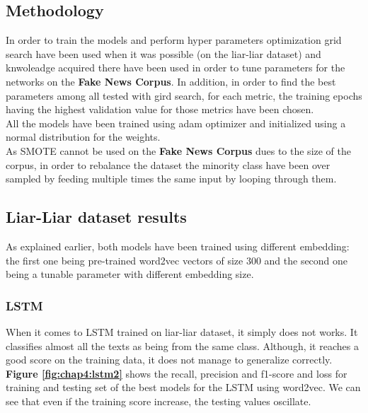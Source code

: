 \subsection{Methodology}
In order to train the models and perform hyper parameters optimization grid search have been used when it was possible (on the liar-liar dataset) and knwoleadge acquired there have been used in order to tune parameters for the networks on the \textbf{Fake News Corpus}. In addition, in order to find the best parameters among all tested with gird search, for each metric, the training epochs having the highest validation value for those metrics have been chosen. \\

All the models have been trained using adam optimizer and initialized using a normal distribution for the weights. \\

As SMOTE cannot be used on the \textbf{Fake News Corpus} dues to the size of the corpus, in order to rebalance the dataset the minority class have been over sampled by feeding multiple times the same input by looping through them. 
\subsection{Liar-Liar dataset results}
As explained earlier, both models have been trained using different embedding: the first one being pre-trained word2vec vectors of size 300 and the second one being a tunable parameter with different embedding size.
\subsubsection{LSTM}
When it comes to LSTM trained on liar-liar dataset, it simply does not works. It classifies almost all the texts as being from the same class. Although, it reaches a good score on the training data, it does not manage to generalize correctly. \textbf{Figure \ref{fig:chap4:lstm2}} shows the recall, precision and f1-score and loss for training and testing set of the best models for the LSTM using word2vec. We can see that even if the training score increase, the testing values oscillate. \\

